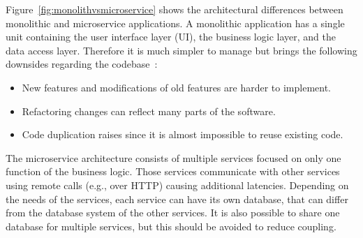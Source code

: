 Figure~\ref{fig:monolithvsmicroservice} shows the architectural differences between monolithic and microservice applications.
A monolithic application has a single unit containing the user interface layer (UI), the business logic layer, and the data access layer.
Therefore it is much simpler to manage but brings the following downsides regarding the codebase~\cite{kalske2017challenges}:
\begin{itemize}
    \item New features and modifications of old features are harder to implement.
    \item Refactoring changes can reflect many parts of the software.
    \item Code duplication raises since it is almost impossible to reuse existing code.
\end{itemize}
The microservice architecture consists of multiple services focused on only one function of the business logic.
Those services communicate with other services using remote calls (e.g., over HTTP) causing additional latencies.
Depending on the needs of the services, each service can have its own database, that can differ from the database system of the other services.
It is also possible to share one database for multiple services, but this should be avoided to reduce coupling. 

